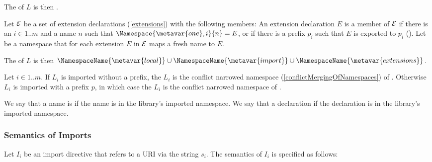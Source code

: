 \documentclass[makeidx]{article}
\begin{document}
{

\LMHash{}%
The  of $L$ is then .

\LMHash{}%
Let $\cal E$ be a set of extension declarations
(\ref{extensions})
with the following members:
An extension declaration $E$ is a member of $\cal E$
if there is an $i \in 1 .. m$ and a name $n$
such that $\Namespace{\metavar{one},i}{n} = E$,
or if there is a prefix $p_i$ such that $E$ is exported to $p_i$
().
%
Let  be a namespace that
for each extension $E$ in $\cal E$ maps a fresh name to $E$.


\LMHash{}%
The  of $L$ is then
$\NamespaceName{\metavar{local}} \cup
\NamespaceName{\metavar{import}} \cup
\NamespaceName{\metavar{extensions}}$.

\LMHash{}%
Let $i \in 1 .. m$.
If $L_i$ is imported without a prefix, the
$L_i$ is the conflict narrowed namespace
(\ref{conflictMergingOfNamespaces})
of .
%
Otherwise $L_i$ is imported with a prefix $p$,
in which case the  $L_i$
is the conflict narrowed namespace
of .


\LMHash{}%
We say that a name is 
if the name is in the library's imported namespace.
We say that a declaration 
if the declaration is in the library's imported namespace.


\subsubsection{Semantics of Imports}

\LMHash{}%
Let $I_i$ be an import directive that refers to a URI via the string $s_i$.
The semantics of $I_i$ is specified as follows:

}
\end{document}
